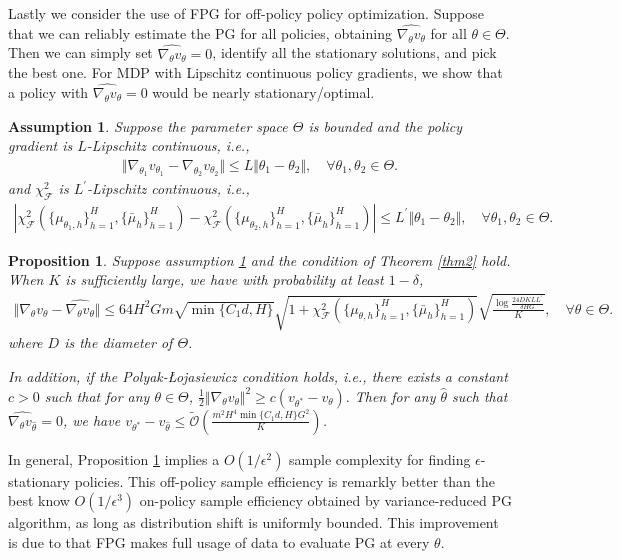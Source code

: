 \documentclass{article}
\newtheorem{assumption}{Assumption}[section]
\newtheorem{proposition}{Proposition}[section]
\numberwithin{equation}{section}
\begin{document}
Lastly we consider the use of FPG for off-policy policy optimization. Suppose that we can reliably estimate the PG for all policies, obtaining $\widehat{\nabla_{\theta}v_{\theta}}$ for all $\theta\in\Theta$. Then we can simply set $\widehat{\nabla_{\theta}v_{\theta}} = 0$, identify all the stationary solutions, and pick the best one. For MDP with Lipschitz continuous policy gradients, we show that a policy with $\widehat{\nabla_{\theta}v_{\theta}} = 0$ would be nearly stationary/optimal.  %
\begin{assumption}\label{Lipschitz_cont}
Suppose the parameter space $\Theta$ is bounded and the policy gradient is $L$-Lipschitz continuous, i.e., 
\begin{align*}
    \Vert\nabla_{\theta_1}v_{\theta_1}-\nabla_{\theta_2}v_{\theta_2}\Vert\leq L\Vert\theta_1-\theta_2\Vert,\quad\forall\theta_1,\theta_2\in\Theta.
\end{align*}
and $\chi^2_{\mathcal{F}}$ is $L^\prime$-Lipschitz continuous, i.e.,
\begin{align*}
    \left\vert\chi_{\mathcal{F}}^2\left(\{\mu_{\theta_1,h}\}_{h=1}^H,\{\bar{\mu}_h\}_{h=1}^H\right)-\chi_{\mathcal{F}}^2\left(\{\mu_{\theta_2,h}\}_{h=1}^H,\{\bar{\mu}_h\}_{h=1}^H\right)\right\vert\leq L^\prime\Vert\theta_1-\theta_2\Vert,\quad\forall\theta_1,\theta_2\in\Theta.
\end{align*}
\end{assumption}
\begin{proposition}
\label{union_bd}
Suppose assumption \ref{Lipschitz_cont} and the condition of Theorem \ref{thm2} hold. When $K$ is sufficiently large, we have with probability at least $1-\delta$, 
\begin{align*}
    \Vert\nabla_\theta v_\theta-\widehat{\nabla_\theta v_\theta}\Vert\leq 64H^2Gm\sqrt{\min\{C_1d,H\}}\sqrt{1+\chi^2_{\mathcal{F}}(\{\mu_{\theta,h}\}_{h=1}^H,\{\bar{\mu}_h\}_{h=1}^H)}\sqrt{\frac{\log\frac{24DKLL^\prime}{\delta HG}}{K}},\quad\forall\theta\in\Theta.
\end{align*}
where $D$ is the diameter of $\Theta$. 

In addition, if the Polyak-Łojasiewicz condition holds, i.e., there exists a constant $c > 0$ such that for any $\theta \in \Theta$, 
$
    \frac{1}{2}\Vert\nabla_\theta v_\theta\Vert^2 \geq c(v_{\theta^*}-v_\theta). 
$
Then for any $\hat{\theta}$ such that $\widehat{\nabla_\theta v_{\hat{\theta}}}=0$, we have
$v_{\theta^*}-v_{\hat{\theta}}\leq \tilde{\mathcal{O}}\left(\frac{m^2H^4\min\{C_1d,H\} G^2}{K}\right)$. 
\end{proposition}
In general, Proposition \ref{union_bd} implies a $O(1/\epsilon^2)$ sample complexity for finding $\epsilon$-stationary policies. This off-policy sample efficiency is remarkly better than the best know $O(1/\epsilon^3)$ on-policy sample efficiency obtained by variance-reduced PG algorithm, as long as distribution shift is uniformly bounded. This improvement is due to that FPG makes full usage of data to evaluate PG at every $\theta$. 
\end{document}
